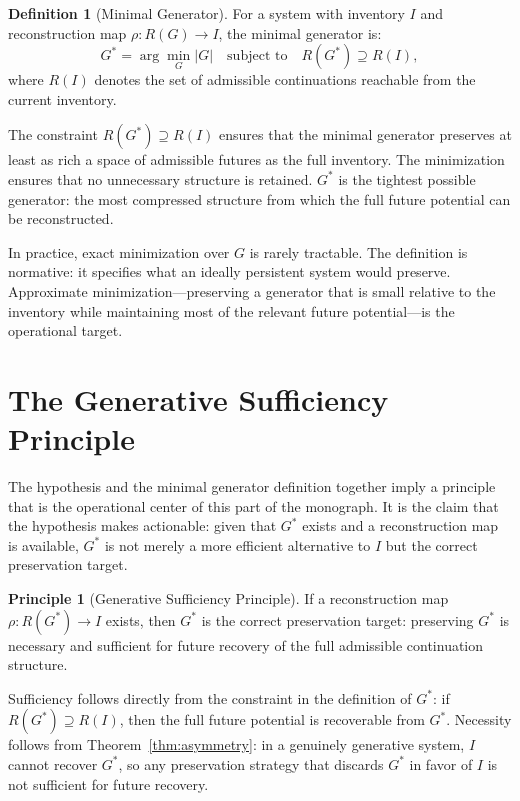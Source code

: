 \documentclass[12pt, oneside]{book}
\theoremstyle{flyxion}
\theoremstyle{definition}
\newtheorem{definition}[theorem]{Definition}
\newtheorem{principle}[theorem]{Principle}
\begin{document}
\begin{definition}[Minimal Generator]
For a system with inventory $I$ and reconstruction map
$\rho : R(G) \to I$, the minimal generator is:
\[
G^* = \arg\min_{G} |G| \quad \text{subject to} \quad
R(G^*) \supseteq R(I),
\]
where $R(I)$ denotes the set of admissible continuations
reachable from the current inventory.
\end{definition}

The constraint $R(G^*) \supseteq R(I)$ ensures that the
minimal generator preserves at least as rich a space of
admissible futures as the full inventory. The minimization
ensures that no unnecessary structure is retained. $G^*$
is the tightest possible generator: the most compressed
structure from which the full future potential can be
reconstructed.

In practice, exact minimization over $G$ is rarely
tractable. The definition is normative: it specifies what
an ideally persistent system would preserve. Approximate
minimization---preserving a generator that is small relative
to the inventory while maintaining most of the relevant
future potential---is the operational target.

\section{The Generative Sufficiency Principle}

The hypothesis and the minimal generator definition together
imply a principle that is the operational center of this part
of the monograph. It is the claim that the hypothesis makes
actionable: given that $G^*$ exists and a reconstruction map
is available, $G^*$ is not merely a more efficient alternative
to $I$ but the correct preservation target.

\begin{principle}[Generative Sufficiency Principle]
\label{prin:sufficiency}
If a reconstruction map $\rho : R(G^*) \to I$ exists, then
$G^*$ is the correct preservation target: preserving $G^*$
is necessary and sufficient for future recovery of the full
admissible continuation structure.
\end{principle}

Sufficiency follows directly from the constraint in the
definition of $G^*$: if $R(G^*) \supseteq R(I)$, then
the full future potential is recoverable from $G^*$.
Necessity follows from Theorem~\ref{thm:asymmetry}: in a
genuinely generative system, $I$ cannot recover $G^*$, so
any preservation strategy that discards $G^*$ in favor of
$I$ is not sufficient for future recovery.
\end{document}

